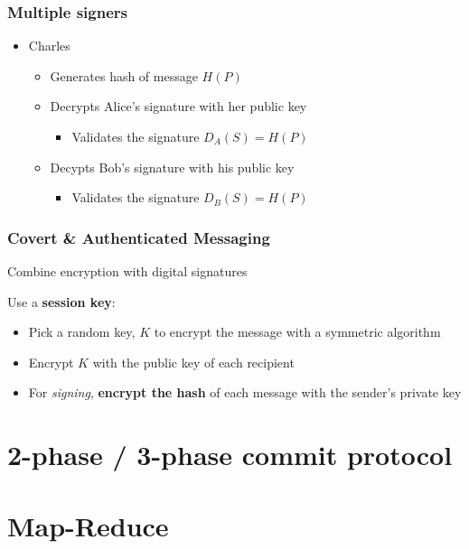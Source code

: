\documentclass{easyclass}
\begin{document}
    \subsection{Multiple signers}
    \begin{itemize}
        \item Charles
        \begin{itemize}
            \item Generates hash of message $H(P)$
            \item Decrypts Alice's signature with her public key
            \begin{itemize}
                \item Validates the signature $D_A(S) = H(P)$
            \end{itemize}
            \item Decypts Bob's signature with his public key
            \begin{itemize}
                \item Validates the signature $D_B(S) = H(P)$
            \end{itemize}
        \end{itemize}
    \end{itemize}

    \subsection{Covert \& Authenticated Messaging}
    Combine encryption with digital signatures

    \begin{theo}{}
        Use a \textbf{session key}:
        \begin{itemize}
            \item Pick a random key, $K$ to encrypt the message with a symmetric algorithm
            \item Encrypt $K$ with the public key of each recipient
            \item For \emph{signing}, \textbf{encrypt the hash} of each message with
            the sender's private key
        \end{itemize}
    \end{theo}
\chapter{2-phase / 3-phase commit protocol}

\chapter{Map-Reduce}
\end{document}
